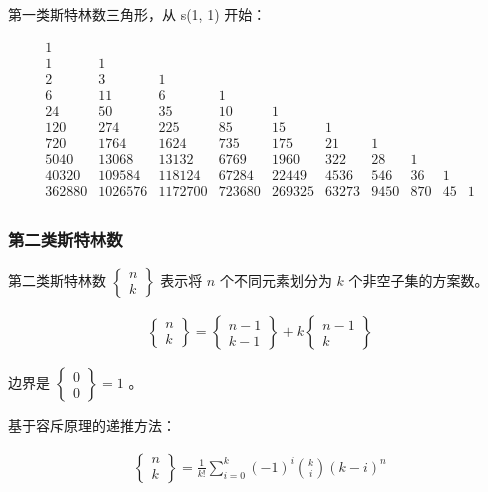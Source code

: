 \documentclass{article}
\begin{document}
第一类斯特林数三角形，从 s(1, 1) 开始：

$$
\begin{matrix}
1 \\
1 & 1 \\
2 & 3 & 1 \\
6 & 11 & 6 & 1 \\
24 & 50 & 35 & 10 & 1 \\
120 & 274 & 225 & 85 & 15 & 1 \\
720 & 1764 & 1624 & 735 & 175 & 21 & 1 \\
5040 & 13068 & 13132 & 6769 & 1960 & 322 & 28 & 1 \\
40320 & 109584 & 118124 & 67284 & 22449 & 4536 & 546 & 36 & 1 \\
362880 & 1026576 & 1172700 & 723680 & 269325 & 63273 & 9450 & 870 & 45 & 1 \\
\end{matrix}
$$


\subsubsection{第二类斯特林数}

第二类斯特林数 $\begin{Bmatrix} n\\k \end{Bmatrix}$ 表示将 $n$ 个不同元素划分为 $k$ 个非空子集的方案数。

$$
\begin{aligned}
\begin{Bmatrix} n\\k \end{Bmatrix}
=
\begin{Bmatrix} n-1\\k-1 \end{Bmatrix}
+
k\begin{Bmatrix} n-1\\k \end{Bmatrix}
\end{aligned}
$$

边界是 $\begin{Bmatrix}0\\0\end{Bmatrix}=1$ 。

基于容斥原理的递推方法：

$$
\begin{aligned}
\begin{Bmatrix} n\\k \end{Bmatrix} =
\frac{1}{k!}\sum^k_{i=0}(-1)^i\binom{k}{i}(k-i)^n
\end{aligned}
$$
\end{document}
